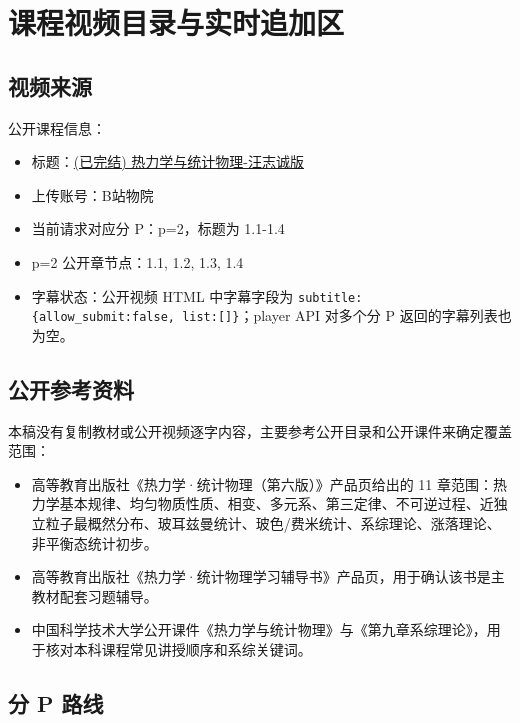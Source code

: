 \chapter{课程视频目录与实时追加区}

\section{视频来源}

公开课程信息：
\begin{itemize}
  \item 标题：\href{https://www.bilibili.com/video/BV1gW5u6UEML}{(已完结) 热力学与统计物理-汪志诚版}
  \item 上传账号：B站物院
  \item 当前请求对应分 P：p=2，标题为 1.1-1.4
  \item p=2 公开章节点：1.1, 1.2, 1.3, 1.4
  \item 字幕状态：公开视频 HTML 中字幕字段为 \verb|subtitle: {allow_submit:false, list:[]}|；player API 对多个分 P 返回的字幕列表也为空。
\end{itemize}

\section{公开参考资料}

本稿没有复制教材或公开视频逐字内容，主要参考公开目录和公开课件来确定覆盖范围：
\begin{itemize}
  \item 高等教育出版社《热力学·统计物理（第六版）》产品页给出的 11 章范围：热力学基本规律、均匀物质性质、相变、多元系、第三定律、不可逆过程、近独立粒子最概然分布、玻耳兹曼统计、玻色/费米统计、系综理论、涨落理论、非平衡态统计初步。
  \item 高等教育出版社《热力学·统计物理学习辅导书》产品页，用于确认该书是主教材配套习题辅导。
  \item 中国科学技术大学公开课件《热力学与统计物理》与《第九章系综理论》，用于核对本科课程常见讲授顺序和系综关键词。
\end{itemize}

\section{分 P 路线}

